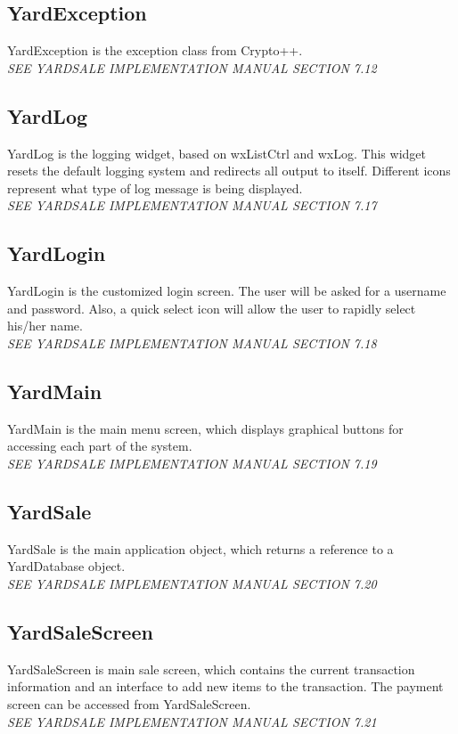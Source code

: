 \documentclass{report}
\begin{document}
        \subsection{YardException}
        YardException is the exception class from Crypto++.\\
        {\sl SEE YARDSALE IMPLEMENTATION MANUAL SECTION 7.12}

        \subsection{YardLog}
        YardLog is the logging widget, based on wxListCtrl and wxLog.
        This widget resets the default logging system and redirects
        all output to itself.  Different icons represent what type of
        log message is being displayed.\\
        {\sl SEE YARDSALE IMPLEMENTATION MANUAL SECTION 7.17}

        \subsection{YardLogin}
        YardLogin is the customized login screen.  The user will be
        asked for a username and password.  Also, a quick select icon
        will allow the user to rapidly select his/her name.\\
        {\sl SEE YARDSALE IMPLEMENTATION MANUAL SECTION 7.18}

        \subsection{YardMain}
        YardMain is the main menu screen, which displays graphical
        buttons for accessing each part of the system.\\
        {\sl SEE YARDSALE IMPLEMENTATION MANUAL SECTION 7.19}

        \subsection{YardSale}
        YardSale is the main application object, which returns a
        reference to a YardDatabase object.\\
        {\sl SEE YARDSALE IMPLEMENTATION MANUAL SECTION 7.20}

        \subsection{YardSaleScreen}
        YardSaleScreen is main sale screen, which contains the current
        transaction information and an interface to add new items to
        the transaction.  The payment screen can be accessed from
        YardSaleScreen.\\
        {\sl SEE YARDSALE IMPLEMENTATION MANUAL SECTION 7.21}
\end{document}
